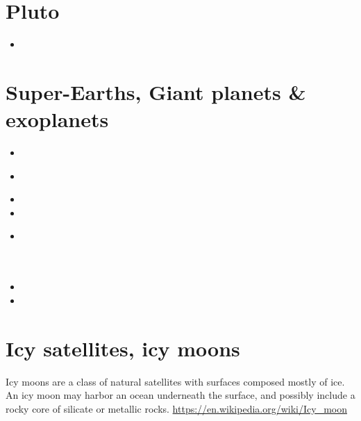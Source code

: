 \section{Pluto}

\begin{small}
\begin{itemize}
\item[\twothousandsixteen] 
\end{itemize}
\end{small}

\section{Super-Earths, Giant planets \& exoplanets}

\begin{small}
\begin{itemize}
\item[\twothousandsix]
\item[\twothousandeleven]
  \\
\item[\twothousandtwelve]
\item[\twothousandthirteen]
\item[\twothousandfifteen] 
  \\
  \\
  \\
\item[\twothousandtwentyone]
\item[\twothousandtwentythree] 
\end{itemize}
\end{small}

\section{Icy satellites, icy moons}

Icy moons are a class of natural satellites with surfaces composed mostly of ice. 
An icy moon may harbor an ocean underneath the surface, and possibly include a rocky 
core of silicate or metallic rocks.
\url{https://en.wikipedia.org/wiki/Icy_moon}

